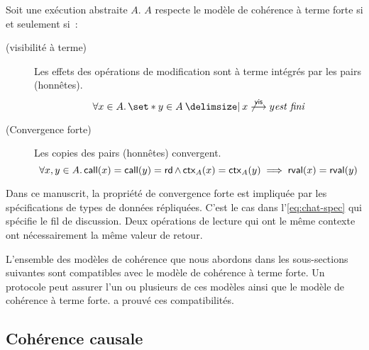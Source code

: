 \begin{definition}\label{def:strong-eventual-consistency}
    Soit une exécution abstraite $A$. $A$ respecte le modèle de cohérence à terme forte si et seulement si~:

    \begin{description}
    \item[ (visibilité à terme)]
    Les effets des opérations de modification sont à terme intégrés par les pairs (honnêtes).
    \begin{equation*}
        \forall x \in A \qsep \set*{y \in A \given x \not\vis y} \textit{est fini}
    \end{equation*}

    \item[ (Convergence forte)]
    Les copies des pairs (honnêtes) convergent.
    \begin{equation*}
        \forall x, y \in A \ldotp \operatorname{\mathsf{call}}(x) = \operatorname{\mathsf{call}}(y) = \operatorname{\mathsf{rd}} \land \operatorname{\mathsf{ctx}}_A(x) = \operatorname{\mathsf{ctx}}_A(y) \implies \operatorname{\mathsf{rval}}(x) = \operatorname{\mathsf{rval}}(y)
    \end{equation*}
    \end{description}
\end{definition}

Dans ce manuscrit, la propriété de convergence forte est impliquée par les spécifications de types de données répliquées.
C'est le cas dans l'\autoref{eq:chat-spec} qui spécifie le fil de discussion.
Deux opérations de lecture qui ont le même contexte ont nécessairement la même valeur de retour.

L'ensemble des modèles de cohérence que nous abordons dans les sous-sections suivantes sont compatibles avec le modèle de cohérence à terme forte.
Un protocole peut assurer l'un ou plusieurs de ces modèles ainsi que le modèle de cohérence à terme forte.
\textcite{mahajan_2011_cac} a prouvé ces compatibilités.

\clearpage

\subsection{Cohérence causale}\label{subsec:caucal-consistency}

